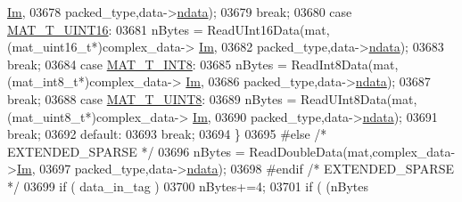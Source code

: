 \begin{DoxyCode}
{{{{{{{{{{{{{{{{{{      \hyperlink{group___m_a_t_a7182d10b0d3598415887376065440946}{Im},
03678                                 packed\_type,data->\hyperlink{group___m_a_t_a1beb8a8c58a808207cbea650563a9b63}{ndata});
03679                             \textcolor{keywordflow}{break};
03680                         \textcolor{keywordflow}{case} \hyperlink{group___m_a_t_ggacf7b3b879282b7ab3a51190e49bf3453a05bc7af7680aa68be95126ae0a4c2e31}{MAT\_T\_UINT16}:
03681                             nBytes = ReadUInt16Data(mat,(mat\_uint16\_t*)complex\_data->
      \hyperlink{group___m_a_t_a7182d10b0d3598415887376065440946}{Im},
03682                                 packed\_type,data->\hyperlink{group___m_a_t_a1beb8a8c58a808207cbea650563a9b63}{ndata});
03683                             \textcolor{keywordflow}{break};
03684                         \textcolor{keywordflow}{case} \hyperlink{group___m_a_t_ggacf7b3b879282b7ab3a51190e49bf3453a9807f5033ed4f9b548953742d9fd1658}{MAT\_T\_INT8}:
03685                             nBytes = ReadInt8Data(mat,(mat\_int8\_t*)complex\_data->
      \hyperlink{group___m_a_t_a7182d10b0d3598415887376065440946}{Im},
03686                                 packed\_type,data->\hyperlink{group___m_a_t_a1beb8a8c58a808207cbea650563a9b63}{ndata});
03687                             \textcolor{keywordflow}{break};
03688                         \textcolor{keywordflow}{case} \hyperlink{group___m_a_t_ggacf7b3b879282b7ab3a51190e49bf3453a01c1bd7db68f90552862eb5d311be408}{MAT\_T\_UINT8}:
03689                             nBytes = ReadUInt8Data(mat,(mat\_uint8\_t*)complex\_data->
      \hyperlink{group___m_a_t_a7182d10b0d3598415887376065440946}{Im},
03690                                 packed\_type,data->\hyperlink{group___m_a_t_a1beb8a8c58a808207cbea650563a9b63}{ndata});
03691                             \textcolor{keywordflow}{break};
03692                         \textcolor{keywordflow}{default}:
03693                             \textcolor{keywordflow}{break};
03694                     \}
03695 \textcolor{preprocessor}{#else }\textcolor{comment}{/* EXTENDED\_SPARSE */}\textcolor{preprocessor}{}
03696                     nBytes = ReadDoubleData(mat,complex\_data->\hyperlink{group___m_a_t_a7182d10b0d3598415887376065440946}{Im},
03697                                  packed\_type,data->\hyperlink{group___m_a_t_a1beb8a8c58a808207cbea650563a9b63}{ndata});
03698 \textcolor{preprocessor}{#endif }\textcolor{comment}{/* EXTENDED\_SPARSE */}\textcolor{preprocessor}{}
03699                     \textcolor{keywordflow}{if} ( data\_in\_tag )
03700                         nBytes+=4;
03701                     \textcolor{keywordflow}{if} ( (nBytes %
}}}}}}}}}}}}}}}}}}
\end{DoxyCode}
